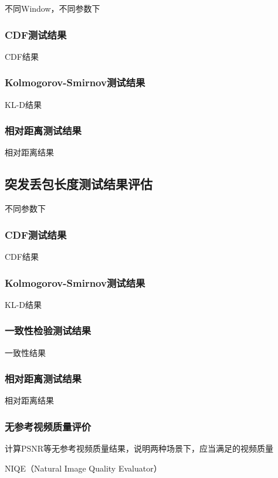 不同Window，不同参数下

\subsubsection{CDF测试结果}
\label{chap:analyze:result:window:cdf}

CDF结果

\subsubsection{Kolmogorov-Smirnov测试结果}
\label{chap:analyze:result:window:kld}

KL-D结果

\subsubsection{相对距离测试结果}
\label{chap:analyze:result:window:distance}

相对距离结果

\subsection{突发丢包长度测试结果评估}
\label{chap:analyze:result:burst}

不同参数下

\subsubsection{CDF测试结果}
\label{chap:analyze:result:burst:cdf}

CDF结果

\subsubsection{Kolmogorov-Smirnov测试结果}
\label{chap:analyze:result:burst:kld}

KL-D结果

\subsubsection{一致性检验测试结果}
\label{chap:analyze:result:burst:statistical}

一致性结果

\subsubsection{相对距离测试结果}
\label{chap:analyze:result:burst:distance}

相对距离结果

\subsubsection{无参考视频质量评价}
\label{chap:analyze:result:burst:vqm}

计算PSNR等无参考视频质量结果，说明两种场景下，应当满足的视频质量

NIQE（Natural Image Quality Evaluator）